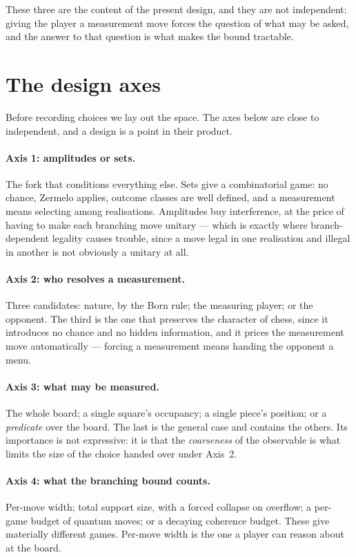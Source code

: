 \documentclass[11pt,a4paper]{article}
\theoremstyle{definition}
\theoremstyle{plain}
\begin{document}
These three are the content of the present design, and they are not
independent: giving the player a measurement move forces the question of what
may be asked, and the answer to that question is what makes the bound
tractable.

\section{The design axes}
\label{sec:axes}

Before recording choices we lay out the space. The axes below are close to
independent, and a design is a point in their product.

\paragraph{Axis 1: amplitudes or sets.}
The fork that conditions everything else. Sets give a combinatorial game: no
chance, Zermelo applies, outcome classes are well defined, and a measurement
means selecting among realisations. Amplitudes buy interference, at the price
of having to make each branching move unitary --- which is exactly where
branch-dependent legality causes trouble, since a move legal in one realisation
and illegal in another is not obviously a unitary at all.

\paragraph{Axis 2: who resolves a measurement.}
Three candidates: nature, by the Born rule; the measuring player; or the
opponent. The third is the one that preserves the character of chess, since it
introduces no chance and no hidden information, and it prices the measurement
move automatically --- forcing a measurement means handing the opponent a
menu.

\paragraph{Axis 3: what may be measured.}
The whole board; a single square's occupancy; a single piece's position; or a
\emph{predicate} over the board. The last is the general case and contains the
others. Its importance is not expressive: it is that the \emph{coarseness} of
the observable is what limits the size of the choice handed over under Axis~2.

\paragraph{Axis 4: what the branching bound counts.}
Per-move width; total support size, with a forced collapse on overflow; a
per-game budget of quantum moves; or a decaying coherence budget. These give
materially different games. Per-move width is the one a player can reason
about at the board.
\end{document}
